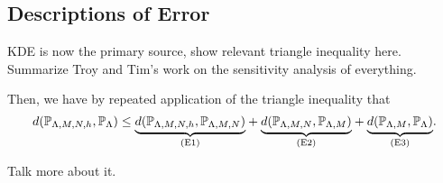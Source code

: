 \subsection{Descriptions of Error}\label{sec:sample-error}

KDE is now the primary source, show relevant triangle inequality here.
Summarize Troy and Tim's work on the sensitivity analysis of everything.


Then, we have by repeated application of the triangle inequality that
\begin{equation}
\label{eq:sample-triangleineq}
d(\mathbb{P}_{{\Lambda}, M, N, h}, \operatorname*{\mathbb{P}_{{\Lambda}}}) \leq
\underset{ \text{(E1)} }{\underbrace{d(\mathbb{P}_{{\Lambda}, M, N, h},\mathbb{P}_{{\Lambda}, M, N})}} +
\underset{ \text{(E2)} }{\underbrace{d(\mathbb{P}_{{\Lambda}, M, N}, \mathbb{P}_{{\Lambda}, M}) }}+
\underset{ \text{(E3)} }{\underbrace{d(\mathbb{P}_{{\Lambda}, M}, \operatorname*{\mathbb{P}_{{\Lambda}}}) }}.
\end{equation}

Talk more about it.

\vspace{2in}
